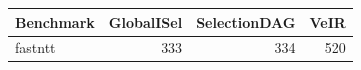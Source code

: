     \centering
    \footnotesize
    \begin{tabular}{l r r r }
        \toprule
        \textbf{Benchmark} & \textbf{GlobalISel} & \textbf{SelectionDAG} & \textbf{VeIR} \\
        \midrule
        fastntt & 333 & 334 & 520 \\
        \bottomrule
    \end{tabular}
    \caption{\#cycles per iteration.}
    \label{tab:real-cycles}
